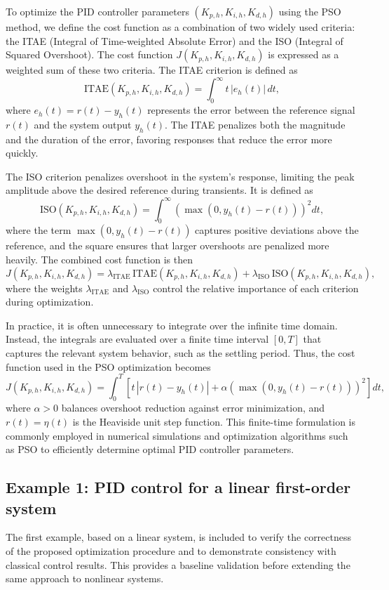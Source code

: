 \documentclass[preprint,12pt]{elsarticle}
\begin{document}
To optimize the PID controller parameters \( (K_{p,h}, K_{i,h}, K_{d,h}) \) using the PSO method, we define the cost function as a combination of two widely used criteria: the ITAE (Integral of Time-weighted Absolute Error) and  the ISO (Integral of Squared Overshoot). The cost function 
\( J(K_{p,h}, K_{i,h}, K_{d,h}) \) is expressed as a weighted sum of these two criteria.  The ITAE criterion is defined as
\[
\text{ITAE}(K_{p,h}, K_{i,h}, K_{d,h}) = \int_0^\infty t \, |e_h(t)| \, dt,
\]
where \( e_h(t) = r(t) - y_h(t) \) represents the error between the reference signal \( r(t) \) and the system output \( y_h(t) \). The ITAE penalizes both the magnitude and the duration of the error, favoring responses that reduce the error more quickly.

The ISO criterion penalizes overshoot in the system's response, limiting the peak amplitude above the desired reference during transients. It is defined as
\[
\text{ISO}(K_{p,h}, K_{i,h}, K_{d,h}) = \int_0^\infty \left( \max(0, y_h(t) - r(t)) \right)^2 dt,
\]
where the term \( \max(0, y_h(t) - r(t)) \) captures positive deviations above the reference, and the square ensures that larger overshoots are penalized more heavily. The combined cost function is then
\[
J(K_{p,h}, K_{i,h}, K_{d,h}) 
= \lambda_{\text{ITAE}} \, \text{ITAE}(K_{p,h}, K_{i,h}, K_{d,h})
+ \lambda_{\text{ISO}} \, \text{ISO}(K_{p,h}, K_{i,h}, K_{d,h}),
\]
where the weights \( \lambda_{\text{ITAE}} \) and \( \lambda_{\text{ISO}} \) control the relative importance of each criterion during optimization.

In practice, it is often unnecessary to integrate over the infinite time domain. Instead, the integrals are evaluated over a finite time interval \([0, T]\) that captures the relevant system behavior, such as the settling period. Thus, the cost function used in the PSO optimization becomes
\begin{equation}\label{ITAE_ISO_criterion}
J(K_{p,h}, K_{i,h}, K_{d,h}) 
= \int_0^T \left[ t \, |r(t)-y_h(t)| + \alpha \left( \max(0, y_h(t) - r(t)) \right)^2 \right] dt,
\end{equation}
where \( \alpha > 0 \) balances overshoot reduction against error minimization, and \( r(t) = \eta(t) \) is the Heaviside unit step function.  
This finite-time formulation is commonly employed in numerical simulations and optimization algorithms such as PSO to efficiently determine optimal PID controller parameters.
\subsection{Example 1: PID control for a linear first-order system}
The first example, based on a linear system, is included to verify the correctness of the proposed optimization procedure and to demonstrate consistency with classical control results. This provides a baseline validation before extending the same approach to nonlinear systems.
\end{document}
